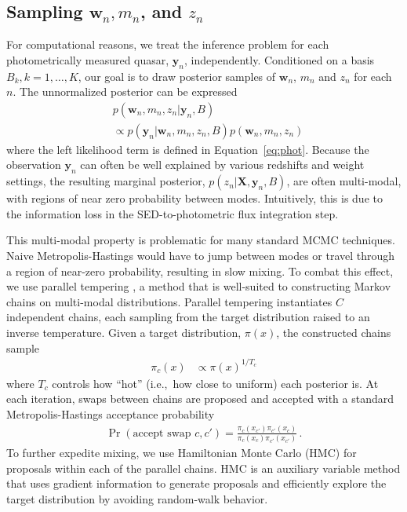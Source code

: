 \documentclass{article} %
\begin{document}
\subsection{Sampling $\mathbf{w}_n, m_n$, and $z_n$}
For computational reasons, we treat the inference problem for each photometrically measured quasar, $\mathbf{y}_n$, independently.
Conditioned on a basis~${B_k, k=1,\dots, K}$, our goal is to draw posterior samples of $\mathbf{w}_n$, $m_n$ and $z_n$ for each $n$.  
The unnormalized posterior can be expressed
\begin{align}
  &p(\mathbf{w}_n, m_n, z_n | \mathbf{y}_n, B) \\
  &\propto p(\mathbf{y}_n | \mathbf{w}_n, m_n, z_n, B) p(\mathbf{w}_n, m_n, z_n) \end{align}
where the left likelihood term is defined in Equation~\ref{eq:phot}.
Because the observation $\mathbf{y}_n$ can often be well explained by various redshifts and weight settings, the resulting marginal posterior, $p(z_n | \mathbf{X}, \mathbf{y}_n, B)$, are often multi-modal, with regions of near zero probability between modes.
Intuitively, this is due to the information loss in the SED-to-photometric flux integration step.

This multi-modal property is problematic for many standard MCMC techniques. 
Naive Metropolis-Hastings would have to jump between modes or travel through a region of near-zero probability, resulting in slow mixing.  
To combat this effect, we use parallel tempering \cite{brooks2011handbook}, a method that is well-suited to constructing Markov chains on multi-modal distributions.
Parallel tempering instantiates $C$ independent chains, each sampling from the target distribution raised to an inverse temperature.
Given a target distribution, $\pi(x)$, the constructed chains sample 
\begin{align}
  \pi_c(x) &\propto \pi(x)^{1/T_c}
\end{align}
where $T_c$ controls how ``hot'' (i.e.,~how close to uniform) each posterior is. 
At each iteration, swaps between chains are proposed and accepted with a standard Metropolis-Hastings acceptance probability 
\begin{align}
  \Pr(\text{accept swap } c, c') = \frac{ \pi_c(x_{c'}) \pi_{c'}(x_c) }{ \pi_c(x_c) \pi_{c'}(x_{c'}) } \, .
\end{align}
To further expedite mixing, we use Hamiltonian Monte Carlo (HMC) \cite{neal2011mcmc} for proposals within each of the parallel chains.
HMC is an auxiliary variable method that uses gradient information to generate proposals and efficiently explore the target distribution by avoiding random-walk behavior.
\end{document}
